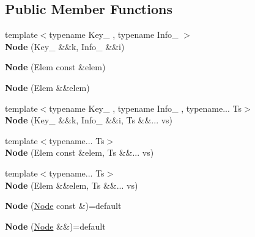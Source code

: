 \subsection*{Public Member Functions}
\begin{DoxyCompactItemize}
\item 
\mbox{\label{structSequence_1_1Node_a2f4a93d593e9127a85d8279e2a094127}} 
{\footnotesize template$<$typename Key\+\_\+ , typename Info\+\_\+ $>$ }\\{\bfseries Node} (Key\+\_\+ \&\&k, Info\+\_\+ \&\&i)
\item 
\mbox{\label{structSequence_1_1Node_a13a6f6425989e057a49fbc3489ad166b}} 
{\bfseries Node} (Elem const \&elem)
\item 
\mbox{\label{structSequence_1_1Node_a0768dc5ce21fe12b1e5d9f3320de9ad5}} 
{\bfseries Node} (Elem \&\&elem)
\item 
\mbox{\label{structSequence_1_1Node_a535ad630311802a396310cd45de2481c}} 
{\footnotesize template$<$typename Key\+\_\+ , typename Info\+\_\+ , typename... Ts$>$ }\\{\bfseries Node} (Key\+\_\+ \&\&k, Info\+\_\+ \&\&i, Ts \&\&... vs)
\item 
\mbox{\label{structSequence_1_1Node_aa16b2184c6a7e211f3171d44b0242b46}} 
{\footnotesize template$<$typename... Ts$>$ }\\{\bfseries Node} (Elem const \&elem, Ts \&\&... vs)
\item 
\mbox{\label{structSequence_1_1Node_ae1ada8d24edfb41b068a4dd5ec764498}} 
{\footnotesize template$<$typename... Ts$>$ }\\{\bfseries Node} (Elem \&\&elem, Ts \&\&... vs)
\item 
\mbox{\label{structSequence_1_1Node_a70ff37bf87f4bd6bd103b04b42ea0e18}} 
{\bfseries Node} (\mbox{\hyperlink{structSequence_1_1Node}{Node}} const \&)=default
\item 
\mbox{\label{structSequence_1_1Node_aa7c182ccbf38269e46d440662e2e7822}} 
{\bfseries Node} (\mbox{\hyperlink{structSequence_1_1Node}{Node}} \&\&)=default

\end{DoxyCompactItemize}
